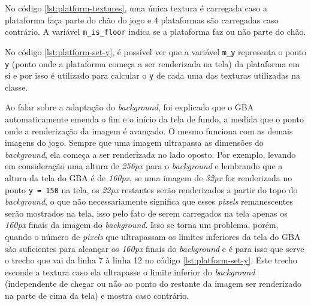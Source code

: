 No código \ref{lst:platform-textures}, uma única textura é carregada caso a plataforma faça parte do chão do jogo e 4 plataformas são carregadas caso contrário. A variável \texttt{m\_is\_floor} indica se a plataforma faz ou não parte do chão.

No código \ref{lst:platform-set-y}, é possível ver que a variável \texttt{m\_y} representa o ponto \texttt{y} (ponto onde a plataforma começa a ser renderizada na tela) da plataforma em si e por isso é utilizado para calcular o \texttt{y} de cada uma das texturas utilizadas na classe.

Ao falar sobre a adaptação do \textit{background}, foi explicado que o GBA automaticamente emenda o fim e o início da tela de fundo, a medida que o ponto onde a renderização da imagem é avançado. O mesmo funciona com as demais imagens do jogo. Sempre que uma imagem ultrapassa as dimensões do \textit{background}, ela começa a ser renderizada no lado oposto. Por exemplo, levando em consideração uma altura de \textit{256px} para o \textit{background} e lembrando que a altura da tela do GBA é de \textit{160px}, se uma imagem de \textit{32px} for renderizada no ponto \texttt{y = 150} na tela, os \textit{22px} restantes serão renderizados a partir do topo do \textit{background}, o que não necessariamente significa que esses \textit{pixels} remanescentes serão mostrados na tela, isso pelo fato de serem carregados na tela apenas os \textit{160px} finais da imagem do \textit{background}. Isso se torna um problema, porém, quando o número de \textit{pixels} que ultrapassam os limites inferiores da tela do GBA são suficientes para alcançar os \textit{160px} finais do \textit{background} e é para isso que serve o trecho que vai da linha 7 à linha 12 no código \ref{lst:platform-set-y}. Este trecho esconde a textura caso ela ultrapasse o limite inferior do \textit{background} (independente de chegar ou não ao ponto do restante da imagem ser renderizado na parte de cima da tela) e mostra caso contrário.
